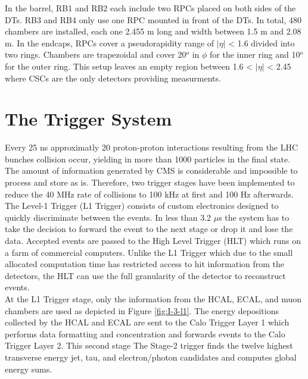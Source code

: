       In the barrel, RB1 and RB2 each include two RPCs placed on both sides of the DTs. RB3 and RB4 only use one RPC mounted in front of the DTs. In total, 480 chambers are installed, each one 2.455 m long and width between 1.5 m and 2.08 m. In the endcaps, RPCs cover a pseudorapidity range of $ | \eta | $ < 1.6 divided into two rings. Chambers are trapezoidal and cover 20$^o$ in $ \phi $ for the inner ring and 10$^o$ for the outer ring. This setup leaves an empty region between 1.6 < $ | \eta | $ < 2.45 where CSCs are the only detectors providing measurments.

  \section{The Trigger System}

    Every 25 ns approximatly 20 proton-proton interactions resulting from the LHC bunches collision occur, yielding in more than 1000 particles in the final state. The amount of information generated by CMS is considerable and impossible to process and store as is. Therefore, two trigger stages have been implemented to reduce the 40 MHz rate of collisions to 100 kHz at first and 100 Hz afterwards. The Level-1 Trigger (L1 Trigger) consists of custom electronics designed to quickly discriminate between the events. In less than 3.2 $\mu$s the system has to take the decision to forward the event to the next stage or drop it and lose the data. Accepted events are passed to the High Level Trigger (HLT) which runs on a farm of commercial computers. Unlike the L1 Trigger which due to the small allocated computation time has restricted access to hit information from the detectors, the HLT can use the full granularity of the detector to reconstruct events. \\

    At the L1 Trigger stage, only the information from the HCAL, ECAL, and muon chambers are used as depicted in Figure \ref{fig:I-3-l1}. The energy depositions collected by the HCAL and ECAL are sent to the Calo Trigger Layer 1 which performs data formatting and concentration and forwards events to the Calo Trigger Layer 2. This second stage The Stage-2 trigger finds the twelve highest transverse energy jet, tau, and electron/photon candidates and computes global energy sums. \\

